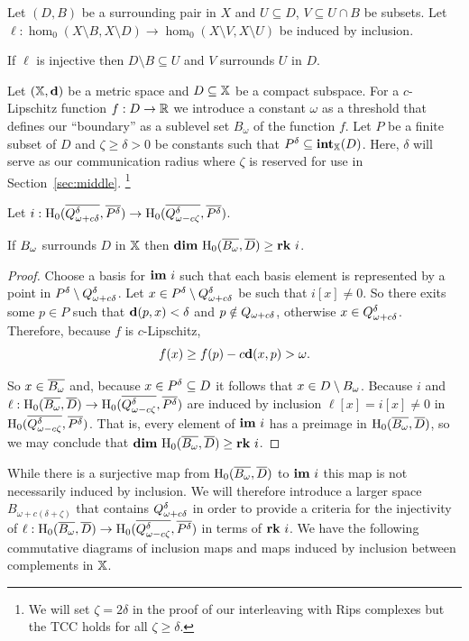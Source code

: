 \begin{lemma}\label{lem:coverage}
  Let $(D, B)$ be a surrounding pair in $X$ and $U\subseteq D$, $V\subseteq U\cap B$ be subsets.
  Let $\ell: \hom_0(X\setminus B, X\setminus D)\to \hom_0(X\setminus V, X\setminus U)$ be induced by inclusion.

  If $\ell$ is injective then $D\setminus B\subseteq U$ and $V$ surrounds $U$ in $D$.
\end{lemma}

Let $(\mathbb{X},\mathbf{d})$ be a metric space and $D\subseteq \mathbb{X}$ be a compact subspace.
For a $c$-Lipschitz function $f : D\to \mathbb{R}$ we introduce a constant $\omega$ as a threshold that defines our ``boundary'' as a sublevel set $B_\omega$ of the function $f$.
Let $P$ be a finite subset of $D$ and $\zeta\geq\delta > 0 $ be constants such that $P^\delta\subseteq \mathbf{int}_{\mathbb{X}}(D)$.
Here, $\delta$ will serve as our communication radius where $\zeta$ is reserved for use in Section~\ref{sec:middle}.
  \footnote{We will set $\zeta = 2\delta$ in the proof of our interleaving with Rips complexes but the TCC holds for all $\zeta\geq\delta$.}

\begin{lemma}\label{lem:psurj}
  Let $i : \mathrm{H}_0(\overline{Q_{\omega + c{\delta}}^{\delta}}, \overline{P^{\delta}})\to \mathrm{H}_0(\overline{Q_{\omega - c\zeta}^{\delta}}, \overline{P^\delta})$.

  If $B_{\omega}$ surrounds $D$ in $\mathbb{X}$ then $\mathbf{dim}~\mathrm{H}_0(\overline{B_{\omega}}, \overline{D})\geq \mathbf{rk}~i$.
\end{lemma}
\begin{proof}
  Choose a basis for $\mathbf{im}~i$ such that each basis element is represented by a point in $P^{\delta}\setminus Q_{\omega + c{\delta}}^{\delta}$.
  Let $x\in P^{\delta}\setminus Q_{\omega + c{\delta}}^{\delta}$ be such that $i[x] \neq 0$.
  So there exits some $p\in P$ such that $\mathbf{d}(p, x) < \delta$ and $p\notin Q_{\omega + c{\delta}}$, otherwise $x\in Q_{\omega + c{\delta}}^{\delta}$.
  Therefore, because $f$ is $c$-Lipschitz,
  \[ f(x)\geq f(p) - c\mathbf{d}(x, p) > \omega.\]

  So $x\in\overline{B_{\omega}}$ and, because $x\in P^{\delta}\subseteq D$ it follows that $x\in D\setminus B_{\omega}$.
  Because $i$ and $\ell : \mathrm{H}_0(\overline{B_{\omega}}, \overline{D})\to \mathrm{H}_0(\overline{Q_{\omega - c\zeta}^{\delta}}, \overline{P^{\delta}})$ are induced by inclusion $\ell[x] = i[x]\neq 0$ in $\mathrm{H}_0(\overline{Q_{\omega - c\zeta}^{\delta}}, \overline{P^{\delta}})$.
  That is, every element of $\mathbf{im}~i$ has a preimage in $\mathrm{H}_0(\overline{B_{\omega}}, \overline{D})$, so we may conclude that $\mathbf{dim}~\mathrm{H}_0(\overline{B_{\omega}}, \overline{D})\geq \mathbf{rk}~i$.
\end{proof}

While there is a surjective map from $\mathrm{H}_0(\overline{B_{\omega}}, \overline{D})$ to $\mathbf{im}~i$ this map is not necessarily induced by inclusion.
We will therefore introduce a larger space $B_{\omega+c(\delta+\zeta)}$ that contains $Q_{\omega + c{\delta}}^{\delta}$ in order to provide a criteria for the injectivity of $\ell : \mathrm{H}_0(\overline{B_{\omega}}, \overline{D})\to\mathrm{H}_0(\overline{Q_{\omega - c\zeta}^{\delta}}, \overline{P^{\delta}})$ in terms of $\mathbf{rk}~i$.
We have the following commutative diagrams of inclusion maps and maps induced by inclusion between complements in $\mathbb{X}$.

